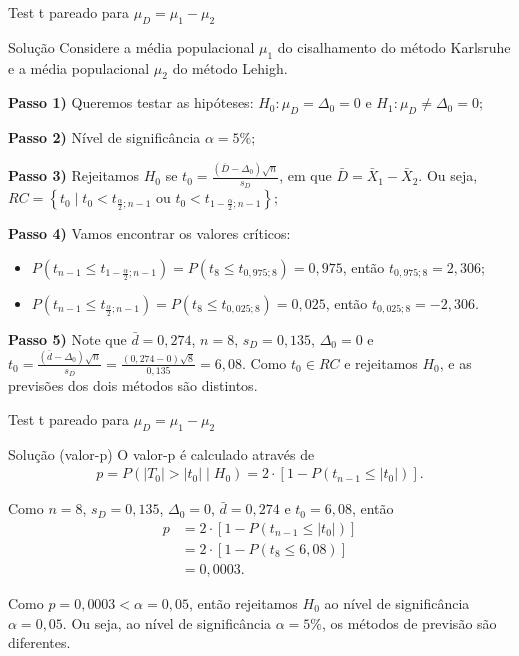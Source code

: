 \documentclass[9pt]{beamer}
\begin{document}
\begin{frame}{Test t pareado para $\mu_D = \mu_1 - \mu_2$}

\begin{block}{Solução}
	Considere a média populacional  $\mu_1$ do cisalhamento do método Karlsruhe e a média populacional $\mu_2$ do método Lehigh.
	
	\textbf{Passo 1)} Queremos testar as hipóteses: $H_0: \mu_D = \Delta_0= 0$ e $H_1: \mu_D \neq \Delta_0= 0$;
	
	\textbf{Passo 2)} Nível de significância $\alpha=5\%$;
	
	\textbf{Passo 3)} Rejeitamos $H_0$ se $t_0 = \frac{(\bar{D} - \Delta_0) \sqrt{n}}{s_D}$, em que $\bar{D} = \bar{X}_1 - \bar{X}_2$. Ou seja, $RC = \left\{ t_0 \mid t_0 < t_{\frac{\alpha}{2}; n-1} \mbox{ ou } t_0 < t_{1-\frac{\alpha}{2}; n-1} \right\}$;
	
	\textbf{Passo 4)} Vamos encontrar os valores críticos:
	\begin{itemize}
		\item $P(t_{n-1} \leq t_{1-\frac{\alpha}{2}; n-1}) = P(t_{8} \leq t_{0,975; 8}) = 0,975$, então $t_{0,975; 8} = 2,306$;
		\item $P(t_{n-1} \leq t_{\frac{\alpha}{2}; n-1}) = P(t_{8} \leq t_{0,025; 8}) = 0,025$, então $t_{0,025; 8} = -2,306$.
	\end{itemize}

	\textbf{Passo 5)} Note que $\bar{d} = 0,274$, $n=8$, $s_D = 0,135$, $\Delta_0=0$ e $t_0 = \frac{(\bar{d} - \Delta_0)\sqrt{n}}{s_D} = \frac{(0,274 - 0)\sqrt{8}}{0,135} = 6,08$. Como $t_0 \in RC$ e rejeitamos $H_0$, e as previsões dos dois métodos são distintos.
\end{block}

\end{frame}

\begin{frame}{Test t pareado para $\mu_D = \mu_1 - \mu_2$}

\begin{block}{Solução (valor-p)}
	O valor-p é calculado através de
	\begin{align*}
		p = P \left( \lvert T_0 \rvert > \lvert t_0 \rvert \mid H_0 \right) = 2 \cdot \left[1 - P \left( t_{n-1}  \leq \lvert t_0 \rvert  \right)\right].
	\end{align*}
	
	Como $n=8$, $s_D = 0,135$, $\Delta_0 = 0$, $\bar{d} = 0,274$ e $t_0 = 6,08$, então
	\begin{align*}
		p &=2 \cdot \left[1 - P \left(t_{n-1} \leq  \lvert t_0 \rvert \right)\right]\\
		&= 2 \cdot \left[1 - P \left(t_{8} \leq   6,08  \right)\right]\\
		&= 0,0003.
	\end{align*}
	
	Como $p=0,0003 < \alpha = 0,05$, então rejeitamos $H_0$ ao nível de significância $\alpha=0,05$. Ou seja, ao nível de significância $\alpha=5\%$, os métodos de previsão são diferentes.
\end{block}

\end{frame}
\end{document}
